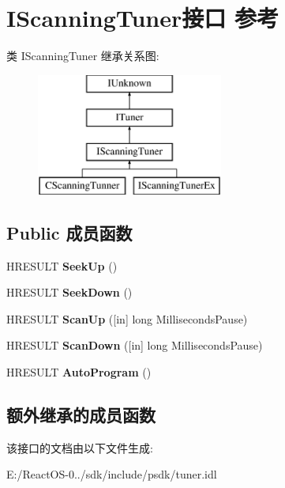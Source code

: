 \hypertarget{interface_i_scanning_tuner}{}\section{I\+Scanning\+Tuner接口 参考}
\label{interface_i_scanning_tuner}
类 I\+Scanning\+Tuner 继承关系图\+:\begin{figure}[H]
\begin{center}
\leavevmode
\includegraphics[height=4.000000cm]{interface_i_scanning_tuner}
\end{center}
\end{figure}
\subsection*{Public 成员函数}
\begin{DoxyCompactItemize}
\item 
\mbox{\label{interface_i_scanning_tuner_a4ebf490563aff341a74fb25d05207583}} 
H\+R\+E\+S\+U\+LT {\bfseries Seek\+Up} ()
\item 
\mbox{\label{interface_i_scanning_tuner_a08c714143f14a25c97ba91cb1bfbb422}} 
H\+R\+E\+S\+U\+LT {\bfseries Seek\+Down} ()
\item 
\mbox{\label{interface_i_scanning_tuner_a3c9c96ec6ea4670c25e89d9edb069fff}} 
H\+R\+E\+S\+U\+LT {\bfseries Scan\+Up} (\mbox{[}in\mbox{]} long Milliseconds\+Pause)
\item 
\mbox{\label{interface_i_scanning_tuner_adc60c58ba1cb65bf1f51b4b257c8b9ed}} 
H\+R\+E\+S\+U\+LT {\bfseries Scan\+Down} (\mbox{[}in\mbox{]} long Milliseconds\+Pause)
\item 
\mbox{\label{interface_i_scanning_tuner_afb3d0cd8386ea23594b5767a0de6a78c}} 
H\+R\+E\+S\+U\+LT {\bfseries Auto\+Program} ()
\end{DoxyCompactItemize}
\subsection*{额外继承的成员函数}


该接口的文档由以下文件生成\+:\begin{DoxyCompactItemize}
\item 
E\+:/\+React\+O\+S-\/0../sdk/include/psdk/tuner.\+idl\end{DoxyCompactItemize}
